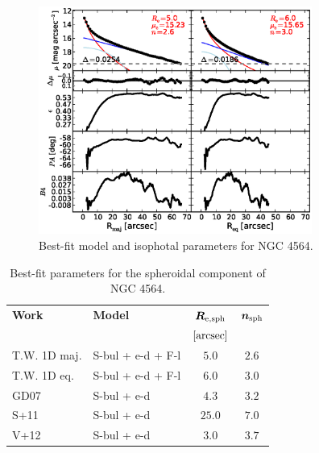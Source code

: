 \documentclass[preprint2]{emulateapj}
\newcommand{\fitfigurewidth}{0.8\textwidth}
\begin{document}
  \begin{figure}[h]
  \begin{center}
  \includegraphics[width=\fitfigurewidth]{images/n4564_1Dfit.eps}
  \caption{Best-fit model and isophotal parameters for NGC 4564.}
  \end{center}
  \end{figure}

  \begin{table}[h]
  \small
  \caption{Best-fit parameters for the spheroidal component of NGC 4564.}
  \begin{center}
  \begin{tabular}{llcc}
  \hline
  {\bf Work} & {\bf Model}   & $\bm R_{\rm e,sph}$    & $\bm n_{\rm sph}$ \\
    &  &  $[\rm arcsec]$ & \\
  \hline
  T.W. 1D maj. & S-bul + e-d + F-l & $5.0$  &  $2.6$ \\
  T.W. 1D eq.  & S-bul + e-d + F-l & $6.0$  &  $3.0$ \\
  \hline
  GD07      & S-bul + e-d & $4.3$  &  $3.2$ \\
  S+11      & S-bul + e-d & $25.0$ &  $7.0$ \\
  V+12      & S-bul + e-d & $3.0$  &  $3.7$ \\
  \hline
  \end{tabular}
  \end{center}
  \label{tab:n4564}
  \end{table}
\end{document}
